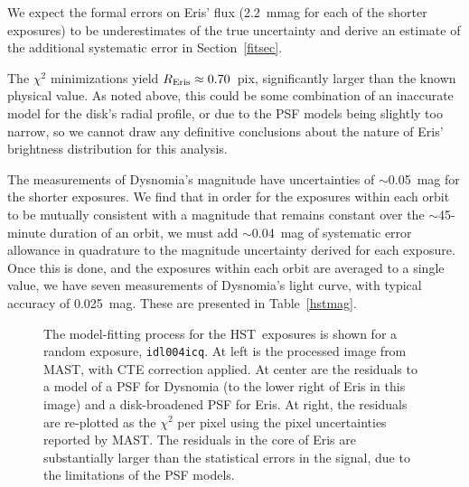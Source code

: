 \documentclass[onecolumn]{aastex631}
\newcommand{\hst}{HST}
\begin{document}
We expect the formal errors on Eris' flux (2.2~mmag for each of the shorter exposures) to be underestimates of the true uncertainty and derive an estimate of the additional systematic error in Section~\ref{fitsec}.

The $\chi^2$ minimizations yield $R_{\rm Eris}\approx0.70$~pix, significantly larger than the known physical value.  As noted above, this could be some combination of an inaccurate model for the disk's radial profile, or due to the PSF models being slightly too narrow, so we cannot draw any definitive conclusions about the nature of Eris' brightness distribution for this analysis.

The measurements of Dysnomia's magnitude have uncertainties of $\sim$0.05~mag for the shorter exposures. We find that in order for the exposures within each orbit to be mutually consistent with a magnitude that remains constant over the $\sim$45-minute duration of an orbit, we must add $\sim$0.04~mag of systematic error allowance in quadrature to the magnitude uncertainty derived for each exposure. Once this is done, and the exposures within each orbit are averaged to a single value, we have seven measurements of Dysnomia's light curve, with typical accuracy of 0.025~mag. These are presented in Table~\ref{hstmag}.

\begin{figure}
  \caption{The model-fitting process for the \hst\ exposures is shown for a random exposure, \texttt{idl004icq}. At left is the processed image from MAST, with CTE correction applied. At center are the residuals to a model of a PSF for Dysnomia (to the lower right of Eris in this image) and a disk-broadened PSF for Eris. At right, the residuals are re-plotted as the $\chi^2$ per pixel using the pixel uncertainties reported by MAST. The residuals in the core of Eris are substantially larger than the statistical errors in the signal, due to the limitations of the PSF models.}
  \label{hstresids}
\end{figure}
\end{document}
